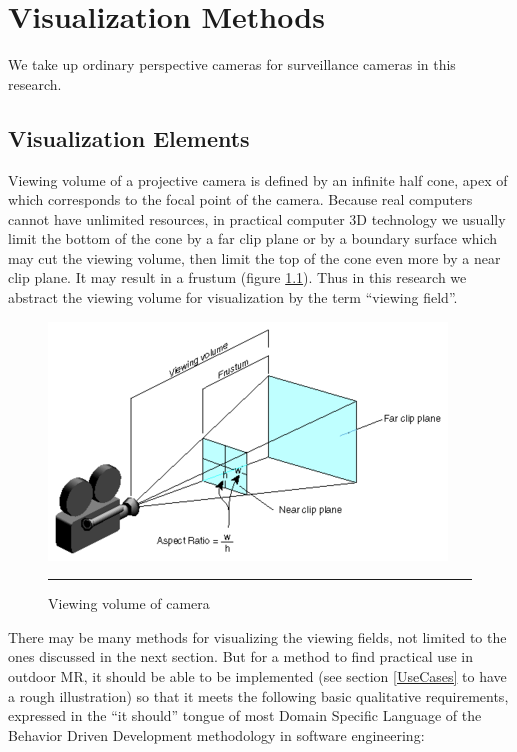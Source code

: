 \chapter{Visualization Methods}
\label{Chapter2}

We take up ordinary perspective cameras for surveillance cameras in this research.


\section{Visualization Elements}
\label{VisualizationRequirements}

Viewing volume of a projective camera is defined by an infinite half cone, apex of which corresponds to the focal point of the camera. Because real computers cannot have unlimited resources, in practical computer 3D technology we usually limit the bottom of the cone by a far clip plane or by a boundary surface which may cut the viewing volume, then limit the top of the cone even more by a near clip plane. It may result in a frustum (figure \ref{fig:ViewingVolume}). Thus in this research we abstract the viewing volume for visualization by the term ``viewing field''.

\begin{figure}[htbp]
	\centering
	\includegraphics{./Primitives/viewing_volume.png}
	\rule{35em}{0.5pt}
	\caption[Viewing volume of camera]{Viewing volume of camera}
	\label{fig:ViewingVolume}
\end{figure}

There may be many methods for visualizing the viewing fields, not limited to the ones discussed in the next section. But for a method to find practical use in outdoor MR, it should be able to be implemented (see section \ref{UseCases} to have a rough illustration) so that it meets the following basic qualitative requirements, expressed in the ``it should'' tongue of most Domain Specific Language of the Behavior Driven Development methodology in software engineering:

